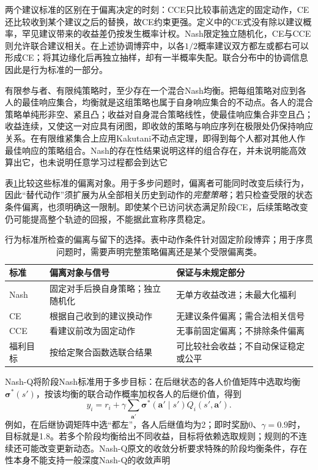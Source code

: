 两个建议标准的区别在于偏离决定的时刻：CCE只比较事前选定的固定动作，CE还比较收到某个建议之后的替换，故CE约束更强。定义中的CE式没有除以建议概率，罕见建议带来的收益差仍按发生概率计权。Nash限定独立随机化，CE与CCE则允许联合建议相关。在上述协调博弈中，以各$1/2$概率建议双方都左或都右可以形成CE；将其边缘化后再独立抽样，却有一半概率失配。联合分布中的协调信息因此是行为标准的一部分。

有限参与者、有限纯策略时，至少存在一个混合Nash均衡。把每组策略对应到各人的最佳响应集合，均衡就是这组策略也属于自身响应集合的不动点。各人的混合策略单纯形非空、紧且凸；收益对自身混合策略线性，使最佳响应集合非空且凸；收益连续，又使这一对应具有闭图，即收敛的策略与响应序列在极限处仍保持响应关系。在有限维紧集合上应用Kakutani不动点定理，即得到每个人都对其他人作最佳响应的策略组合。Nash的存在性结果说明这样的组合存在，并未说明能高效算出它，也未说明任意学习过程都会到达它

表\ref{tab:rl-multi-agent-equilibria}比较这些标准的偏离对象。用于多步问题时，偏离者可能同时改变后续行为，因此“替代动作”须扩展为从全部相关历史到动作的\emph{完整策略}；若只检查受限的状态条件偏离，也须明确这一限制。即使某个已访问状态满足阶段CE，后续策略改变仍可能提高整个轨迹的回报，不能据此宣称序贯稳定。

\begin{table}[htbp]
 \centering
 \begin{tabularx}{\linewidth}{@{}l >{\raggedright\arraybackslash}X >{\raggedright\arraybackslash}X@{}}
 \toprule
 标准 & 偏离对象与信号 & 保证与未规定部分\\
 \midrule
 Nash & 固定对手后换自身策略；独立随机化 & 无单方收益改进；未最大化福利\\
 CE & 根据自己收到的建议换动作 & 无建议条件偏离；需合法相关信号\\
 CCE & 看建议前改为固定动作 & 无事前固定偏离；不排除条件偏离\\
 福利目标 & 按给定聚合函数选联合结果 & 可比较社会收益；不自动保证稳定或公平\\
 \bottomrule
 \end{tabularx}
 \caption{行为标准所检查的偏离与留下的选择。表中动作条件针对固定阶段博弈；用于序贯问题时，需要声明完整策略偏离还是某个受限偏离类。}
 \label{tab:rl-multi-agent-equilibria}
\end{table}

Nash-Q将阶段Nash标准用于多步目标：在后继状态的各人价值矩阵中选取均衡$\bm\sigma^*(s')$，按该均衡的联合动作概率加权各人的后继价值，得到
\[
 y_i=r_i+\gamma\sum_{\bm a'}\bm\sigma^*(\bm a'\mid s')
                         Q_i(s',\bm a').
\]
例如，在后继协调矩阵中选“都左”，各人后继值均为2；即时奖励0、$\gamma=0.9$时，目标就是1.8。若多个阶段均衡给出不同收益，目标将依赖选取规则；规则的不连续还可能改变更新动态。Nash-Q原文的收敛分析要求特殊的阶段均衡条件，存在性本身不能支持一般深度Nash-Q的收敛声明

